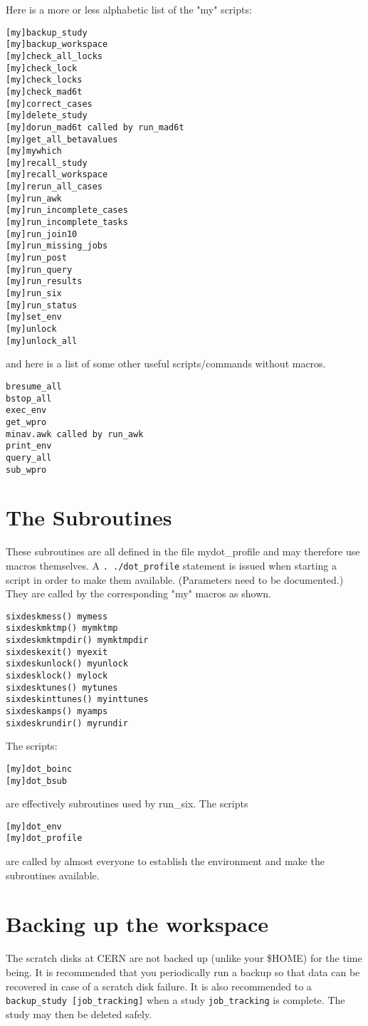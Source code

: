 \documentclass{cernatsnote}    %
\begin{document}
Here is a more or less alphabetic list of the "my" scripts:
\begin{verbatim}
[my]backup_study
[my]backup_workspace
[my]check_all_locks
[my]check_lock
[my]check_locks
[my]check_mad6t
[my]correct_cases
[my]delete_study
[my]dorun_mad6t called by run_mad6t
[my]get_all_betavalues
[my]mywhich
[my]recall_study
[my]recall_workspace
[my]rerun_all_cases
[my]run_awk
[my]run_incomplete_cases
[my]run_incomplete_tasks
[my]run_join10
[my]run_missing_jobs
[my]run_post
[my]run_query
[my]run_results
[my]run_six
[my]run_status
[my]set_env
[my]unlock
[my]unlock_all
\end{verbatim}
and here is a list of some other useful scripts/commands without macros. 
\begin{verbatim}
bresume_all
bstop_all
exec_env
get_wpro
minav.awk called by run_awk
print_env
query_all
sub_wpro
\end{verbatim}
\section{The Subroutines}
These subroutines are all defined in the file mydot\_profile
and may therefore use macros themselves. A {\tt . ./dot\_profile}
statement is issued when starting a script in order to make
them available. (Parameters need to be documented.)
They are called by the corresponding "my" macros as shown.
\begin{verbatim}
sixdeskmess() mymess
sixdeskmktmp() mymktmp
sixdeskmktmpdir() mymktmpdir
sixdeskexit() myexit
sixdeskunlock() myunlock
sixdesklock() mylock
sixdesktunes() mytunes
sixdeskinttunes() myinttunes
sixdeskamps() myamps
sixdeskrundir() myrundir
\end{verbatim}
The scripts:
\begin{verbatim}
[my]dot_boinc
[my]dot_bsub
\end{verbatim}
are effectively subroutines used by run\_six. 
The scripts 
\begin{verbatim}
[my]dot_env
[my]dot_profile
\end{verbatim} are called by almost everyone to establish the environment
and make the subroutines available.

\section{Backing up the workspace}
\label{sec:backup}
 The scratch disks at CERN are not backed up (unlike your \$HOME) for the time being.
It is recommended that you periodically run a backup so that data can be recovered 
in case of a scratch disk failure. It is also recommended to a
{\tt backup\_study [job\_tracking]} when a study {\tt job\_tracking} is complete. The study may then
be deleted safely.
\end{document}
